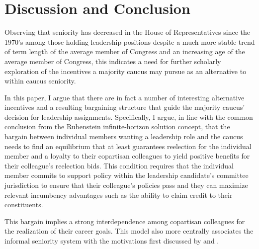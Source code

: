 \documentclass [12pt]{article}
\begin{document}
\section*{Discussion and Conclusion}

Observing that seniority has decreased in the House of Representatives since the 1970's among those holding leadership positions despite a much more stable trend of term length of the average member of Congress and an increasing age of the average member of Congress, this indicates a need for further scholarly exploration of the incentives a majority caucus may pursue as an alternative to within caucus seniority. 

In this paper, I argue that there are in fact a number of interesting alternative incentives and a resulting bargaining structure that guide the majority caucus' decision for leadership assignments. Specifically, I argue, in line with the common conclusion from the Rubenstein infinite-horizon solution concept, that the bargain between individual members wanting a leadership role and the caucus needs to find an equilibrium that at least guarantees reelection for the individual member and a loyalty to their copartisan colleagues to yield positive benefits for their colleague's reelection bids. This condition requires that the individual member commits to support policy within the leadership candidate's committee jurisdiction to ensure that their colleague's policies pass and they can maximize relevant incumbency advantages such as the ability to claim credit to their constituents.

This bargain implies a strong interdependence among copartisan colleagues for the realization of their career goals. This model also more centrally associates the informal seniority system with the motivations first discussed by  and .  

\newpage


\end{document}

